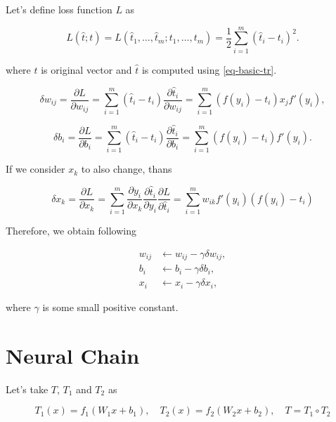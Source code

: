 \documentclass{article}
\numberwithin{equation}{section}
\theoremstyle{definition}
\theoremstyle{remark}
\begin{document}
Let's define loss function $L$ as

\begin{equation}\label{eq-basic-loss}
    L(\hat{t};t) = L(\hat{t}_1,\dots,\hat{t}_m;t_1,\dots,t_m) = \frac{1}{2}\sum_{i=1}^{m} \left( \hat{t}_i - t_i \right)^2.
\end{equation}

where $t$ is original vector and $\hat{t}$ is computed using \eqref{eq-basic-tr}.

\[
    \delta w_{ij} =  \frac{\partial L}{\partial w_{ij}} = 
    \sum_{i=1}^{m} \left( \hat{t}_i - t_i \right) \frac{\partial \hat{t}_{i}}{\partial w_{ij}} =
    \sum_{i=1}^{m} \left( f(y_{i}) - t_i \right)  x_{j} f'(y_{i}),
\]

\[
    \delta b_{i} =\frac{\partial L}{\partial b_{i}} = \sum_{i=1}^{m} \left( \hat{t}_i - t_i \right) \frac{\partial \hat{t}_{i}}{\partial b_{i}} =
     \sum_{i=1}^{m} \left( f(y_{i}) - t_i \right) f'(y_{i}).
\]

If we consider $x_k$ to also change, thans

\[
    \delta x_k = \frac{\partial L}{\partial x_{k}} = 
    \sum_{i=1}^{m}
        \frac{\partial y_{i}}{\partial x_{k}}
        \frac{\partial \hat{t}_{i}}{\partial y_{i}}
        \frac{\partial L}{\partial \hat{t}_{i}} = 
    \sum_{i=1}^{m}
        w_{ik} f'(y_{i}) \left(  f(y_{i}) - t_i \right)
\]



Therefore, we obtain following

\begin{align}
    w_{ij} &\leftarrow w_{ij} - \gamma \delta w_{ij}, \\
    b_{i} & \leftarrow b_{i} - \gamma \delta b_{i}, \\
    x_{i} & \leftarrow x_{i} - \gamma \delta x_{i},
\end{align}

where $\gamma$ is some small positive constant.

\section{Neural Chain}

Let's take $T$, $T_1$ and $T_2$ as

\[
    T_1(x) = f_1(W_1 x + b_1), \quad T_2(x) = f_2(W_2 x + b_2), \quad
    T = T_1 \circ T_2
\]
\end{document}
